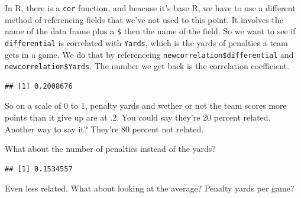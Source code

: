 \documentclass[]{book}
\newenvironment{Shaded}{\begin{snugshade}}{\end{snugshade}}
\newcommand{\KeywordTok}[1]{\textcolor[rgb]{0.13,0.29,0.53}{\textbf{#1}}}
\newcommand{\DataTypeTok}[1]{\textcolor[rgb]{0.13,0.29,0.53}{#1}}
\newcommand{\StringTok}[1]{\textcolor[rgb]{0.31,0.60,0.02}{#1}}
\newcommand{\OperatorTok}[1]{\textcolor[rgb]{0.81,0.36,0.00}{\textbf{#1}}}
\newcommand{\NormalTok}[1]{#1}
\begin{document}
In R, there is a \texttt{cor} function, and beacuse it's base R, we have
to use a different method of referencing fields that we've not used to
this point. It involves the name of the data frame plus a \texttt{\$}
then the name of the field. So we want to see if \texttt{differential}
is correlated with \texttt{Yards}, which is the yards of penalties a
team gets in a game. We do that by referenceing
\texttt{newcorrelation\$differential} and
\texttt{newcorrelation\$Yards}. The number we get back is the
correlation coefficient.

\begin{Shaded}
\end{Shaded}

\begin{verbatim}
## [1] 0.2008676
\end{verbatim}

So on a scale of 0 to 1, penalty yards and wether or not the team scores
more points than it give up are at .2. You could say they're 20 percent
related. Another way to say it? They're 80 percent not related.

What about the number of penalties instead of the yards?

\begin{Shaded}
\end{Shaded}

\begin{verbatim}
## [1] 0.1534557
\end{verbatim}

Even less related. What about looking at the average? Penalty yards per
game?

\begin{Shaded}
\end{Shaded}
\end{document}
